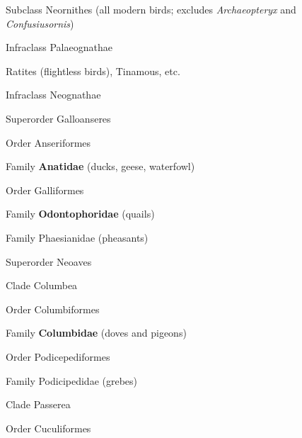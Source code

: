 \documentclass[10pt]{article}
\newlength\mylength
\newcommand*{\growparindent}{\addtolength{\parindent}{\mylength}}
\newcommand*{\reduceparindent}{\addtolength{\parindent}{-1\mylength}}
\begin{document}
\begin{spacing}{1.35}

Subclass Neornithes (all modern birds; excludes \textit{Archaeopteryx} and \textit{Confusiusornis})


\growparindent
Infraclass Palaeognathae

  \growparindent
  Ratites (flightless birds), Tinamous, etc.



\reduceparindent
Infraclass Neognathae

  \growparindent
  Superorder Galloanseres

	\growparindent

    Order Anseriformes
     
     	\growparindent
     	
     	Family \textbf{Anatidae} (ducks, geese, waterfowl)
     	
 
    \reduceparindent
    
    Order Galliformes
     
     	\growparindent
     
 	    Family \textbf{Odontophoridae} (quails)
     
     	Family Phaesianidae (pheasants)

 
\reduceparindent

\reduceparindent
Superorder Neoaves
  
  \growparindent
  
    Clade Columbea

	\growparindent
	
    Order Columbiformes
    
    	\growparindent
    	
    	Family \textbf{Columbidae} (doves and pigeons)
    	
    \reduceparindent
      
    Order Podicepediformes
    
    	\growparindent
    	
    	Family Podicipedidae (grebes)


    \reduceparindent

    Clade Passerea
    
    	\growparindent
     	Order Cuculiformes
      
	      \growparindent
      

\end{spacing}
\end{document}
